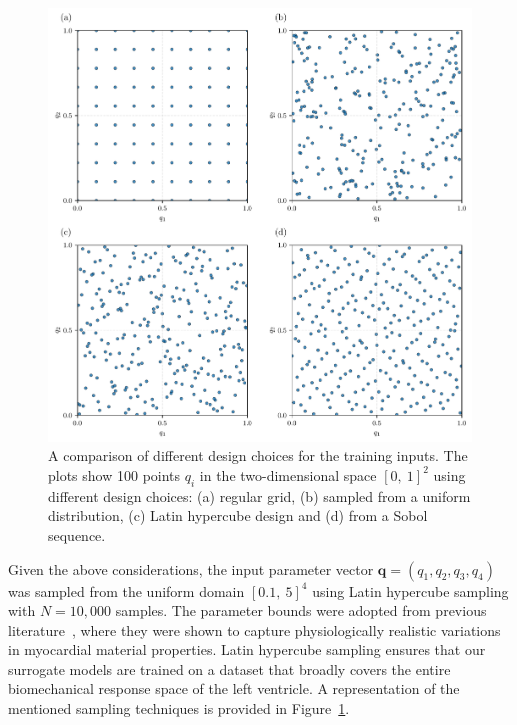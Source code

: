 \documentclass[a4paper,11pt]{article}
\begin{document}
\begin{figure}[H]
\centering
\includegraphics[width=\textwidth]{images/exp_des.pdf}
\caption{A comparison of different design choices for the training inputs. The plots show 100 points $q_i$ in the two-dimensional space \( [0,\ 1]^2 \) using different
design choices: (a) regular grid, (b) sampled from a uniform distribution, (c) Latin hypercube design and (d) from a Sobol sequence.}
\label{exp_des}
\end{figure}

Given the above considerations, the input parameter vector \( \mathbf{q} = (q_1, q_2, q_3, q_4) \) was sampled from the uniform domain \( [0.1,\ 5]^4 \) using Latin hypercube sampling with \( N = 10,\!000 \) samples. The parameter bounds were adopted from previous literature~\cite{noe2019gaussian, davies2019fast}, where they were shown to capture physiologically realistic variations in myocardial material properties. Latin hypercube sampling ensures that our surrogate models are trained on a dataset that broadly covers the entire biomechanical response space of the left ventricle. A representation of the mentioned sampling techniques is provided in Figure~\ref{exp_des}.



\end{document}
